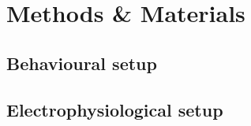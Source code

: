 \section{Methods \& Materials} \label{methods}

\subsection{Behavioural setup}
\lipsum[2]

\subsection{Electrophysiological setup}
\lipsum[2] 








